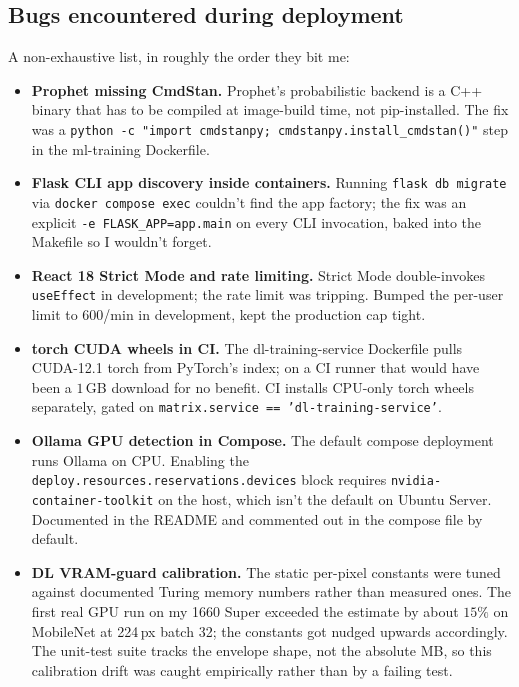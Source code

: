 \documentclass[12pt, a4paper]{report}
\begin{document}
\subsection{Bugs encountered during deployment}

A non-exhaustive list, in roughly the order they bit me:

\begin{itemize}
    \item \textbf{Prophet missing CmdStan.} Prophet's probabilistic
        backend is a C++ binary that has to be compiled at image-build
        time, not pip-installed. The fix was a
        \texttt{python -c "import\,cmdstanpy;\,cmdstanpy.install\_cmdstan()"}
        step in the ml-training Dockerfile.
    \item \textbf{Flask CLI app discovery inside containers.} Running
        \texttt{flask db migrate} via \texttt{docker compose exec}
        couldn't find the app factory; the fix was an explicit
        \texttt{-e FLASK\_APP=app.main} on every CLI invocation,
        baked into the Makefile so I wouldn't forget.
    \item \textbf{React 18 Strict Mode and rate limiting.} Strict
        Mode double-invokes \texttt{useEffect} in development; the
        rate limit was tripping. Bumped the per-user limit to
        $600$/min in development, kept the production cap tight.
    \item \textbf{torch CUDA wheels in CI.} The dl-training-service
        Dockerfile pulls CUDA-12.1 torch from PyTorch's index; on a
        CI runner that would have been a $1$\,GB download for no
        benefit. CI installs CPU-only torch wheels separately, gated
        on \texttt{matrix.service == 'dl-training-service'}.
    \item \textbf{Ollama GPU detection in Compose.} The default
        compose deployment runs Ollama on CPU. Enabling the
        \texttt{deploy.resources.reservations.devices} block requires
        \texttt{nvidia-container-toolkit} on the host, which isn't
        the default on Ubuntu Server. Documented in the README and
        commented out in the compose file by default.
    \item \textbf{DL VRAM-guard calibration.} The static per-pixel
        constants were tuned against documented Turing memory
        numbers rather than measured ones. The first real GPU run
        on my 1660 Super exceeded the estimate by about $15\%$ on
        MobileNet at 224\,px batch 32; the constants got nudged
        upwards accordingly. The unit-test suite tracks the envelope
        shape, not the absolute MB, so this calibration drift was
        caught empirically rather than by a failing test.
\end{itemize}
\end{document}
